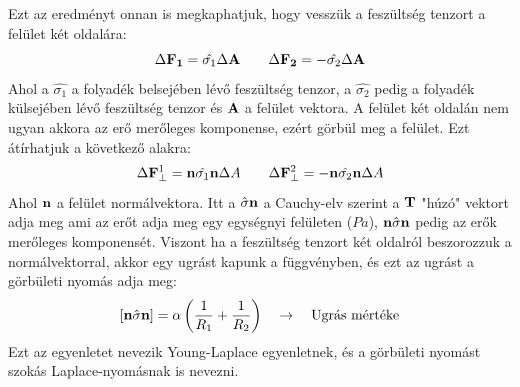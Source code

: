 \documentclass[a4paper,12pt]{article}
\begin{document}
Ezt az eredményt onnan is megkaphatjuk, hogy vesszük a feszültség tenzort a felület két oldalára:
\begin{equation}
    \Delta \bold{F_1} = \hat{\sigma_1} \Delta \bold{A} \quad \quad \Delta \bold{F_2} = - \hat{\sigma_2} \Delta \bold{A}
\end{equation}
Ahol a $\hat{\sigma_1}$ a folyadék belsejében lévő feszültség tenzor, a $\hat{\sigma_2}$ pedig a folyadék külsejében lévő feszültség tenzor és $\bold{A}$ a felület vektora.
A felület két oldalán nem ugyan akkora az erő merőleges komponense, ezért görbül meg a felület. Ezt átírhatjuk a következő alakra:
\begin{equation}
    \Delta \bold{F}_{\bot}^1 = \bold{n} \hat{\sigma_1} \bold{n} \Delta A \quad \quad \Delta \bold{F}_{\bot}^2 = -  \bold{n} \hat{\sigma_2} \bold{n} \Delta A
\end{equation}
Ahol $\bold{n}$ a felület normálvektora. Itt a $\hat{\sigma} \bold{n}$ a Cauchy-elv szerint a $\bold{T}$ "húzó" vektort adja meg ami az erőt adja meg egy egységnyi felületen ($Pa$),
 $\bold{n} \hat{\sigma} \bold{n}$ pedig az erők merőleges komponensét. Viszont ha a feszültség tenzort két oldalról beszorozzuk a normálvektorral,
akkor egy ugrást kapunk a függvényben, és ezt az ugrást a görbületi nyomás adja meg:
\begin{equation}
    \left[\bold{n} \hat{\sigma} \bold{n}\right] = \alpha \left(\frac{1}{R_1} + \frac{1}{R_2}\right) \quad \rightarrow \quad \text{Ugrás mértéke}
\end{equation}
Ezt az egyenletet nevezik Young-Laplace egyenletnek, és a görbületi nyomást szokás Laplace-nyomásnak is nevezni.
\end{document}

